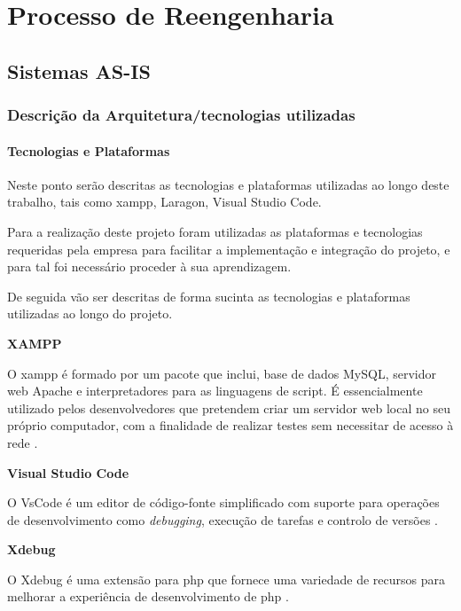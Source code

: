 
\chapter{Processo de Reengenharia}


\section{Sistemas AS-IS}
\subsection{Descrição da Arquitetura/tecnologias utilizadas}
\subsubsection{Tecnologias e Plataformas}
\label{tecnologias}
\par Neste ponto serão descritas as tecnologias e plataformas utilizadas ao longo deste trabalho, tais como \acrshort{xampp}, Laragon, Visual Studio Code.
\par Para a realização deste projeto foram utilizadas as plataformas e tecnologias requeridas pela empresa para facilitar a implementação e integração do projeto, e para tal foi necessário proceder à sua aprendizagem.
\par De seguida vão ser descritas de forma sucinta as tecnologias e plataformas utilizadas ao longo do projeto.\newline


\textbf{XAMPP}

O \acrshort{xampp} é formado por um pacote que inclui, base de dados MySQL, servidor web Apache e interpretadores para as linguagens de script. É essencialmente utilizado pelos desenvolvedores que pretendem criar um servidor web local no seu próprio computador, com a finalidade de realizar testes sem necessitar de acesso à rede \citep{xampp}.\newline


\textbf{Visual Studio Code}

O VsCode é um editor de código-fonte simplificado com suporte para operações de desenvolvimento como \textit{debugging}, execução de tarefas e controlo de versões \citep{vscode}.\newline %

\quad \textbf{Xdebug}

\quad O Xdebug é uma extensão para \acrshort{php} que fornece uma variedade de recursos para melhorar a experiência de desenvolvimento de \acrshort{php} \citep{xdebug}.\newline


